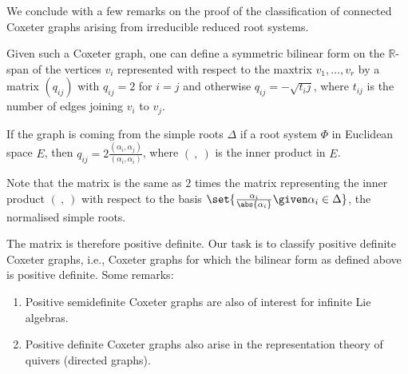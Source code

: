 We conclude with a few remarks on the proof of the classification of connected
Coxeter graphs arising from irreducible reduced root systems.

Given such a Coxeter graph, one can define a symmetric bilinear form on the
$\mathbb{R}$-span of the vertices $v_i$ represented with respect to the maxtrix
$v_1, \ldots, v_r$ by a matrix $(q_{ij})$ with $q_{ij} = 2$ for $i = j$ and otherwise
$q_{ij} = -\sqrt{t_ij}$, where $t_{ij}$ is the number of edges joining $v_i$ to
$v_j$.

If the graph is coming from the simple roots $\Delta$ if a root system $\Phi$ in
Euclidean space $E$, then $q_{ij} = 2\frac{(\alpha_i, \alpha_j)}{(\alpha_i, \alpha_i)}$,
where $(\ ,\ )$ is the inner product in $E$.

Note that the matrix is the same as $2$ times the matrix representing the inner product
$(\ ,\ )$ with respect to the basis $\set{\frac{\alpha_i}{\abs{\alpha_i}}\given \alpha_i \in \Delta}$,
the normalised simple roots.

The matrix is therefore positive definite. Our task is to classify positive definite
Coxeter graphs, i.e., Coxeter graphs for which the bilinear form as defined above
is positive definite. Some remarks:
\begin{enumerate}
	\item Positive semidefinite Coxeter graphs are also of interest for infinite
		Lie algebras.
	\item Positive definite Coxeter graphs also arise in the representation theory
		of quivers (directed graphs).
\end{enumerate}
